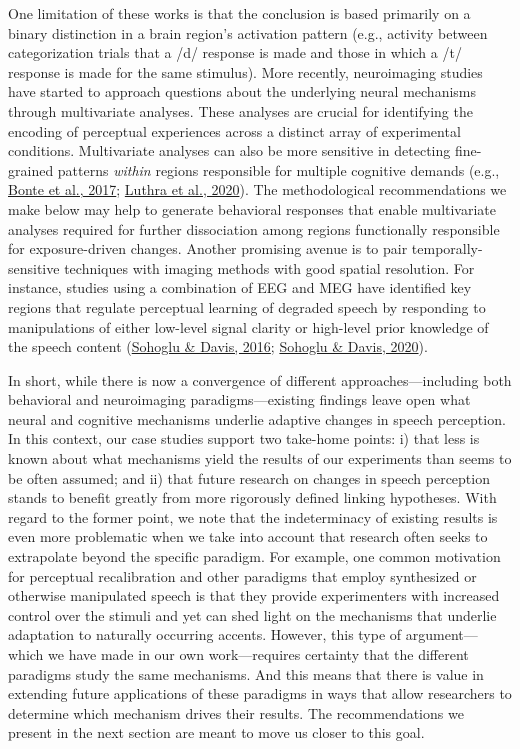 \documentclass[
  11pt,
  english,
  man,floatsintext]{apa6}
\begin{document}
One limitation of these works is that the conclusion is based primarily on a binary distinction in a brain region's activation pattern (e.g., activity between categorization trials that a /d/ response is made and those in which a /t/ response is made for the same stimulus). More recently, neuroimaging studies have started to approach questions about the underlying neural mechanisms through multivariate analyses. These analyses are crucial for identifying the encoding of perceptual experiences across a distinct array of experimental conditions. Multivariate analyses can also be more sensitive in detecting fine-grained patterns \emph{within} regions responsible for multiple cognitive demands (e.g., \protect\hyperlink{ref-bonte2017}{Bonte et al., 2017}; \protect\hyperlink{ref-luthra2020}{Luthra et al., 2020}). The methodological recommendations we make below may help to generate behavioral responses that enable multivariate analyses required for further dissociation among regions functionally responsible for exposure-driven changes. Another promising avenue is to pair temporally-sensitive techniques with imaging methods with good spatial resolution. For instance, studies using a combination of EEG and MEG have identified key regions that regulate perceptual learning of degraded speech by responding to manipulations of either low-level signal clarity or high-level prior knowledge of the speech content (\protect\hyperlink{ref-sohoglu-davis2016}{Sohoglu \& Davis, 2016}; \protect\hyperlink{ref-sohoglu-davis2020}{Sohoglu \& Davis, 2020}).

In short, while there is now a convergence of different approaches---including both behavioral and neuroimaging paradigms---existing findings leave open what neural and cognitive mechanisms underlie adaptive changes in speech perception. In this context, our case studies support two take-home points: i) that less is known about what mechanisms yield the results of our experiments than seems to be often assumed; and ii) that future research on changes in speech perception stands to benefit greatly from more rigorously defined linking hypotheses. With regard to the former point, we note that the indeterminacy of existing results is even more problematic when we take into account that research often seeks to extrapolate beyond the specific paradigm. For example, one common motivation for perceptual recalibration and other paradigms that employ synthesized or otherwise manipulated speech is that they provide experimenters with increased control over the stimuli and yet can shed light on the mechanisms that underlie adaptation to naturally occurring accents. However, this type of argument---which we have made in our own work---requires certainty that the different paradigms study the same mechanisms. And this means that there is value in extending future applications of these paradigms in ways that allow researchers to determine which mechanism drives their results. The recommendations we present in the next section are meant to move us closer to this goal.
\end{document}
